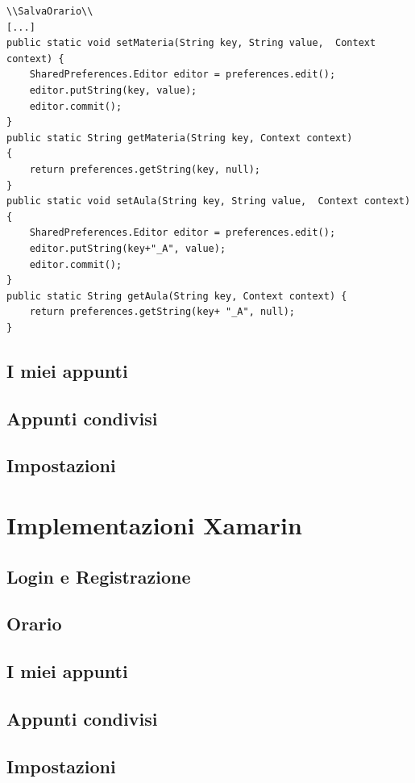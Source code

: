 \documentclass[a4paper, 50pt, twoside]{article}
\begin{document}
\begin{lstlisting}
\\SalvaOrario\\
[...]
public static void setMateria(String key, String value,  Context context) {
	SharedPreferences.Editor editor = preferences.edit();
	editor.putString(key, value);
	editor.commit();
}
public static String getMateria(String key, Context context)
{
	return preferences.getString(key, null);
}
public static void setAula(String key, String value,  Context context) {
	SharedPreferences.Editor editor = preferences.edit();
	editor.putString(key+"_A", value);
	editor.commit();
}
public static String getAula(String key, Context context) {
	return preferences.getString(key+ "_A", null);
}
\end{lstlisting}

\newpage
\subsection{I miei appunti}
\subsection{Appunti condivisi}
\subsection{Impostazioni}

\section{Implementazioni Xamarin}
\subsection{Login e Registrazione}
\subsection{Orario}
\subsection{I miei appunti}
\subsection{Appunti condivisi}
\subsection{Impostazioni}
\end{document}
